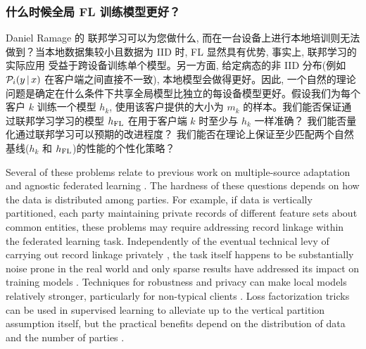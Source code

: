 \subsubsection*{什么时候全局 FL 训练模型更好？}
Daniel Ramage 的 %
联邦学习可以为您做什么, 而在一台设备上进行本地培训则无法做到？当本地数据集较小且数据为 IID 时, FL 显然具有优势, 事实上, 联邦学习的实际应用 \cite{yang18gboardquery, hard18gboard, chen19oov} 受益于跨设备训练单个模型。另一方面, 给定病态的非 IID 分布(例如 $\mathcal{P}_i(y \,|\, x)$ 在客户端之间直接不一致), 本地模型会做得更好。因此, 一个自然的理论问题是确定在什么条件下共享全局模型比独立的每设备模型更好。假设我们为每个客户 $k$ 训练一个模型 $h_k$, 使用该客户提供的大小为 $m_k$ 的样本。我们能否保证通过联邦学习学习的模型 $h_{\text{FL}}$ 在用于客户端 $k$ 时至少与 $h_k$ 一样准确？
我们能否量化通过联邦学习可以预期的改进程度？
我们能否在理论上保证至少匹配两个自然基线($h_k$ 和 $h_{\text{FL}}$)的性能的个性化策略？


Several of these problems relate to previous work on multiple-source adaptation and agnostic federated learning \citep{mansour2009domain,mansour2009domainb,hoffman2018algorithms,Mohri2019}. The hardness of these questions depends on how the data is distributed among parties. For example, if data is vertically partitioned, each party  maintaining private records of different feature sets about common entities, these problems may require addressing record linkage \cite{christen12} within the federated learning task. Independently of the eventual technical levy of carrying out record linkage privately \cite{schnell11}, the task itself happens to be substantially noise prone in the real world \cite{sEP} and only sparse results have addressed its impact on training models \cite{Hardy2017-da}. Techniques for robustness and privacy can make local models relatively stronger, particularly for non-typical clients \citep{yu2020salvaging}. Loss factorization tricks can be used in supervised learning to alleviate up to the vertical partition assumption itself, but the practical benefits depend on the distribution of data and the number of parties \cite{pnhcFL}.

